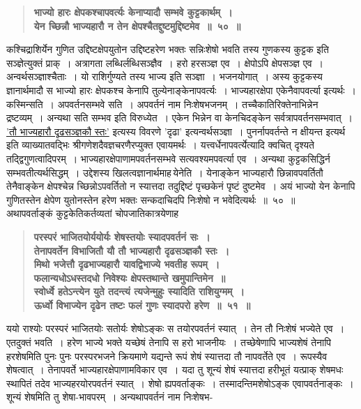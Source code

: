 \documentclass[11pt, openany]{book}
\begin{document}
\newpage

\begin{sloppypar}
 \label{5.50}
\begin{quote}
{\large \textbf{{\color{purple}भाज्यो हारः क्षेपकश्चापवर्त्यः केनाप्यादौ सम्भवे कुट्टकार्थम्~।\\
येन च्छिन्नौ भाज्यहारौ न तेन क्षेपश्चैतद्दुष्टमुद्दिष्टमेव~॥~५०~॥}}}
\end{quote}

कश्चिद्राशिर्येन गुणित उद्दिष्टक्षेपयुतोन उद्दिष्टहरेण भक्तः सन्निःशेषो भवति तस्य गुणकस्य कुट्टक इति सञ्ज्ञेत्युक्तं प्राक्~। अत्रागता लब्धिर्लब्धिसञ्ज्ञैव~। हरो हरसञ्ज्ञ एव~। क्षेपोऽपि क्षेपसञ्ज्ञ एव~। अन्वर्थसञ्ज्ञाश्चैताः~। यो राशिर्गुण्यते तस्य भाज्य इति सञ्ज्ञा~। भजनयोगात्~। अस्य कुट्टकस्य ज्ञानार्थमादौ स भाज्यो हारः क्षेपकश्च केनापि तुल्येनाङ्केनापवर्त्यः~। भाज्यहारक्षेपा एकेनैवापवर्त्या इत्यर्थः~। कस्मिन्सति~। अपवर्तनसम्भवे सति~। अपवर्तनं नाम निःशेषभजनम्~। तच्चैकातिरिक्तेनाभिन्नेन द्रष्टव्यम्~। अन्यथा सति सम्भव इति विरुध्येत~। एकेन भिन्नेन वा केनचिदङ्केन सर्वत्रापवर्तनसम्भवात्~। \hyperref[5.51]{'तौ भाज्यहारौ दृढसञ्ज्ञकौ स्तः'} इत्यस्य विवरणे 'दृढा' इत्यन्वर्थसञ्ज्ञा~। पुनर्नापवर्तन्ते न क्षीयन्त इत्यर्थ इति व्याख्यातवद्भिः श्रीगणेशदैवज्ञचरणैरप्युक्त एवायमर्थः~। यत्त्वर्धेनापवर्त्येत्यादि क्वचित् दृश्यते तद्द्विगुणत्वादिपरम्~। भाज्यहारक्षेपाणामपवर्तनसम्भवे सत्यवश्यमपवर्त्या एव~। अन्यथा कुट्टकसिद्धिर्न सम्भवतीत्यर्थसिद्धम्~। उद्देशस्य खिलत्वज्ञानार्थमाह\textendash \,येनेति~। येनाङ्केन भाज्यहारौ छिन्नावपवर्तितौ तेनैवाङ्केन क्षेपश्चेन्न च्छिन्नोऽपवर्तितो न स्यात्तदा तदुद्दिष्टं पृच्छकेनं पृष्टं दुष्टमेव~। अयं भाज्यो येन केनापि गुणितस्तेन क्षेपेण युतोनस्तेन हरेण भक्तः सन्कदाचिदपि निःशेषो न भवेदित्यर्थः~॥~५०~॥\\

{\small अथापवर्ताङ्कं कुट्टकेतिकर्तव्यतां चोपजातिकात्रयेणाह\textendash }

 \label{5.51}
\begin{quote}
{\large \textbf{{\color{purple}परस्परं भाजितयोर्ययोर्यः शेषस्तयोः स्यादपवर्तनं सः~।\\
तेनापवर्तेन विभाजितौ यौ तौ भाज्यहारौ दृढसञ्ज्ञकौ स्तः~।\\
मिथो भजेत्तौ दृढभाज्यहारौ यावद्विभाज्ये भवतीह रूपम्~।\\
फलान्यधोऽधस्तदधो निवेश्यः क्षेपस्तथान्ते खमुपान्तिमेन~॥\\
स्वोर्ध्वे हतेऽन्त्येन युते तदन्त्यं त्यजेन्मुहुः स्यादिति राशियुग्मम्~।\\
ऊर्ध्वो विभाज्येन दृढेन तष्टः फलं गुणः स्यादपरो हरेण~॥~५१~॥}}}
\end{quote}

ययो राश्योः परस्परं भाजितयोः सतोर्यः शेषोऽङ्कः स तयोरपवर्तनं स्यात्~। तेन तौ निःशेषं भज्येते एव~। एतदुक्तं भवति~। हरेण भाज्ये भक्ते यच्छेषं तेनापि स हरो भाजनीयः~। तच्छेषेणापि भाज्यशेषं तेनापि हरशेषमिति पुनः पुनः परस्परभजने क्रियमाणे यद्यन्ते रूपं शेषं स्यात्तदा तौ नापवर्तेते एव~। रूपस्यैव शेषत्वात्~। तेनापवर्ते भाज्यहारक्षेपाणामविकार एव~। यदा तु शून्यं शेषं स्यात्तदा हरीभूतं यत्प्राक् शेषमधः स्थापितं तदेव भाज्यहरयोरपवर्तनं स्यात्~। शेषो ह्यपवर्ताङ्कः~। तस्मादन्तिमशेषोऽङ्क एवापवर्तनाङ्कः~। शून्यं शेषमिति तु शेषा-भावपरम्~। अन्यथापवर्तनं नाम निःशेषभ-
\end{sloppypar}
\end{document}
